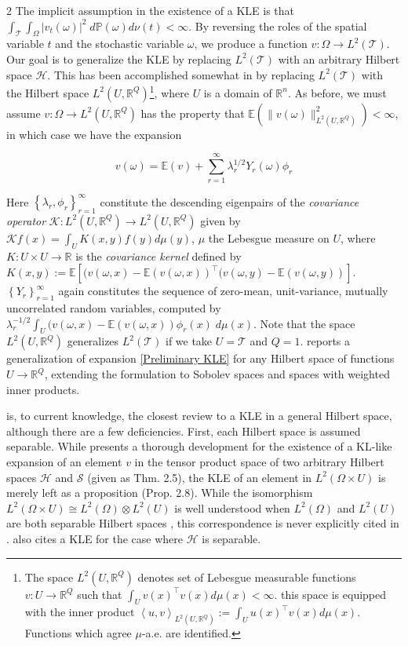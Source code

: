 \documentclass{article}
\numberwithin{theorem}{section}
\numberwithin{lemma}{section}
\numberwithin{definition}{section}
\numberwithin{assumption}{section}
\numberwithin{proposition}{section}
\numberwithin{remark}{section}
\numberwithin{corollary}{section}
\numberwithin{conjecture}{section}
\numberwithin{example}{section}
\newcommand{\R}{\mathbb{R}}
\newcommand{\E}{\mathbb{E}}
\newcommand{\bset}[1]{\left \lbrace #1 \right \rbrace}
\newcommand{\aset}[1]{\left \langle #1 \right \rangle}
\newcommand{\CH}{\mathcal H}
\begin{document}
\begin{multicols*}{2}
The implicit assumption in the existence of a KLE is that $\int_\mathcal T \int_\Omega |v_t(\omega)|^2 \; d \mathbb P(\omega) d \nu(t) < \infty$. By reversing the roles of the spatial variable $t$ and the stochastic variable $\omega$, we produce a function $v:\Omega \to L^2(\mathcal T)$. Our goal is to generalize the KLE by replacing $L^2(\mathcal T)$ with an arbitrary Hilbert space $\mathcal H$. This has been accomplished somewhat in \cite{castrilloncandas2022, betz2014} by replacing $L^2(\mathcal T)$ with the Hilbert space $L^2(U, \R^Q)$\footnote{The space $L^2(U, \R^Q)$ denotes set of Lebesgue measurable functions $v: U \to \R^Q$ such that $\int_U v(x)^\top v(x) d\mu(x) < \infty$. this space is equipped with the inner product $\aset{u,v}_{L^2(U, \R^Q)} := \int_U  u(x)^\top v(x) d \mu(x)$. Functions which agree $\mu$-a.e. are identified.}, where $U$ is a domain of $\R^n$. As before, we must assume $v: \Omega \to L^2(U, \R^Q)$ has the property that $\E(\|v(\omega)\|_{L^2(U, \R^Q)}^2) < \infty$, in which case we have the expansion

\begin{equation} \label{Preliminary KLE}
    v(\omega) = \E(v) + \sum_{r=1}^\infty \lambda_r^{1/2} Y_r(\omega) \phi_r
\end{equation}


Here $\bset{\lambda_r, \phi_r}_{r=1}^\infty$ constitute the descending eigenpairs of the \textit{covariance operator} $\mathscr K: L^2(U, \R^Q) \to L^2(U, \R^Q)$ given by $\mathscr Kf (x) = \int_U K(x,y) f(y) d \mu(y)$, $\mu$ the Lebesgue measure on $U$, where $K: U \times U \to \R$ is the \textit{covariance kernel} defined by $K(x,y) :=  \E[(v(\omega, x) - \E(v(\omega, x))^\top(v(\omega, y) - \E(v(\omega,y))]$.
$\bset{Y_r}_{r=1}^\infty$ again constitutes the sequence of zero-mean, unit-variance, mutually uncorrelated random variables, computed by $\lambda_r^{-1/2} \int_U (v(\omega,x) - \E(v(\omega,x)) \phi_r(x)\; d \mu(x)$. Note that the space $L^2(U, \R^Q)$ generalizes $L^2(\mathcal T)$ if we take $U = \mathcal T$ and $Q = 1$. \cite{levy1999} reports a generalization of expansion \eqref{Preliminary KLE}  for any Hilbert space of functions $U \to \R^Q$, extending the formulation to Sobolev spaces and spaces with weighted inner products.  

\parencite{Schwab2006} is, to current knowledge, the closest review to a KLE in a general Hilbert space, although there are a few deficiencies. First, each Hilbert space is assumed separable. While \cite{Schwab2006} presents a thorough development for the existence of a KL-like expansion of an element $v$ in the tensor product space of two arbitrary Hilbert spaces $\mathcal H$ and $\mathcal S$ (given as Thm. 2.5), the KLE of an element in $L^2(\Omega \times U)$ is merely left as a proposition (Prop. 2.8). While the isomorphism $L^2(\Omega \times U) \cong L^2(\Omega) \otimes L^2(U)$ is well understood when $L^2(\Omega)$ and $L^2(U)$ are both separable Hilbert spaces \cite{kolmogorov1961}, this correspondence is never explicitly cited in \parencite{Schwab2006}. \cite{picci26} also cites a KLE for the case where $\CH$ is separable. 


\end{multicols*}
\end{document}
